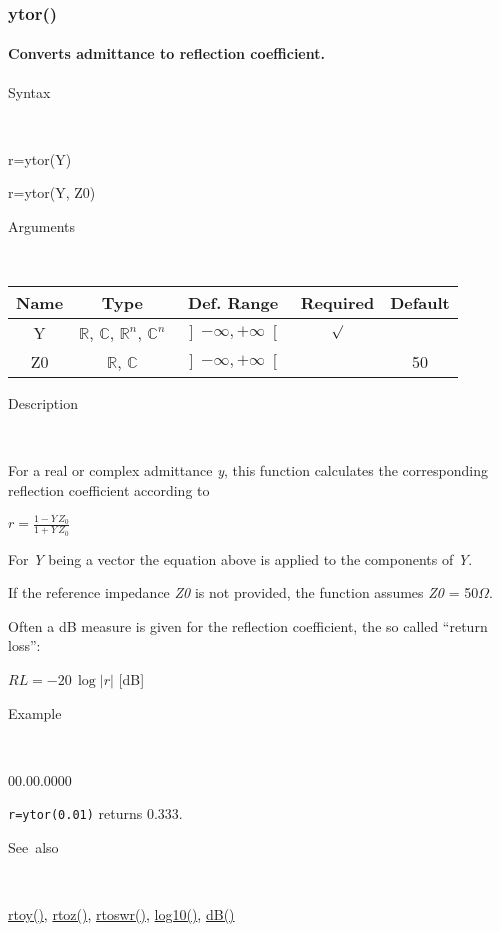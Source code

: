 \newpage
\subsubsection*{\hypertarget{ytor}{}{\Large ytor()}}


\paragraph{\label{par:ytor}Converts admittance to reflection coefficient.}

\begin{description}
\item [Syntax]~
\end{description}
r=ytor(Y)

\noindent r=ytor(Y, Z0)

\begin{description}
\item [Arguments]~
\end{description}
\begin{tabular}{|c|c|c|c|c|}
\hline 
Name&
Type&
Def. Range&
Required&
Default\tabularnewline
\hline
\hline 
Y&
$\mathbb{R}$, $\mathbb{C}$, $\mathbb{R}^{n}$, $\mathbb{C}^{n}$&
$\left]-\infty,+\infty\right[$&
$\surd$&
\tabularnewline
\hline
Z0&
$\mathbb{R}$, $\mathbb{C}$&
$\left]-\infty,+\infty\right[$&
&
50\tabularnewline
\hline
\end{tabular}

\begin{description}
\item [Description]~
\end{description}
For a real or complex admittance \textit{y}, this function calculates
the corresponding reflection coefficient according to 

\medskip{}
$r={\displaystyle \frac{1-Y\, Z_{0}}{1+Y\, Z_{0}}}$
\medskip{}

\noindent For \textit{Y} being a vector the equation above is applied
to the components of \textit{Y}.

\noindent If the reference impedance \textit{Z0} is not provided,
the function assumes \textit{Z0} = 50$\Omega$.

\noindent Often a dB measure is given for the reflection coefficient,
the so called {}``return loss'':

$RL=-20\,\log\left|r\right|$ {[}dB{]}

\begin{description}
\item [Example]~
\end{description}
\begin{lyxlist}{00.00.0000}
\item [\texttt{r=ytor(0.01)}]returns 0.333.
\end{lyxlist}
\begin{description}
\item [See~also]~
\end{description}
\textcolor{blue}{\hyperlink{rtoy}{rtoy()}}\textcolor{black}{,} \textcolor{blue}{\hyperlink{rtoz}{rtoz()}}\textcolor{black}{,}
\textcolor{blue}{\hyperlink{rtoswr}{rtoswr()}}\textcolor{black}{,}
\textcolor{blue}{\hyperlink{log10}{log10()}}\textcolor{black}{,}
\textcolor{blue}{\hyperlink{dB}{dB()}}


